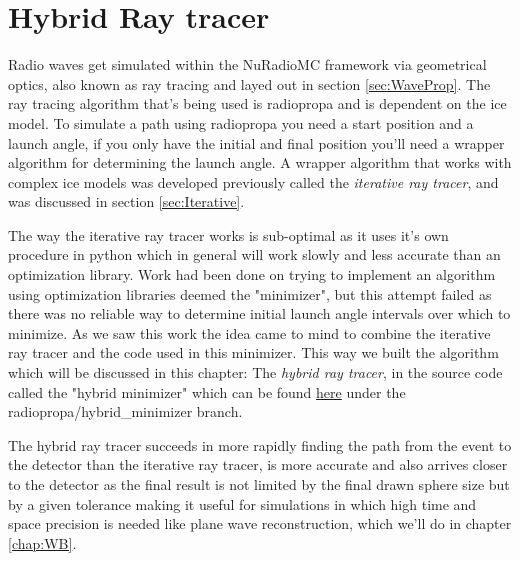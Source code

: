 \chapter{Hybrid Ray tracer}
\label{chapter:hybrid}
Radio waves get simulated within the NuRadioMC framework via geometrical
optics, also known as ray tracing and layed out in section \ref{sec:WaveProp}.
The ray tracing algorithm that's being used is radiopropa and is dependent on
the ice model. To simulate a path using radiopropa you need a start position 
and a launch angle, if you only have the initial and final position you'll need
a wrapper algorithm for determining the launch angle.  
A wrapper algorithm that works with complex ice models was developed previously
called the \textit{iterative ray tracer}\cite{2022icrc.confE1027O}, and was
discussed in section \ref{sec:Iterative}.

The way the iterative ray tracer works is sub-optimal as it uses it's own
procedure in python which in general will work slowly and less accurate than an
optimization library. Work had been done on trying to implement an algorithm
using optimization libraries deemed the "minimizer", but this attempt failed as
there was no reliable way to determine initial launch angle intervals over
which to minimize.  As we saw this work the idea came to mind to combine the
iterative ray tracer and the code used in this minimizer. This way we
built the algorithm which will be discussed in this chapter: The \textit{hybrid ray
tracer}, in the source code called the "hybrid minimizer" which can be found
\href{https://github.com/arthuradriaens-code/NuRadioMC.git}{here} under the
radiopropa/hybrid\_minimizer branch.

The hybrid ray tracer succeeds in more rapidly finding the path from the event
to the detector than the iterative ray tracer, is more accurate and also
arrives closer to the detector as the final result is not limited by the final
drawn sphere size but by a given tolerance making it useful for simulations in
which high time and space precision is needed like plane wave reconstruction,
which we'll do in chapter \ref{chap:WB}.

